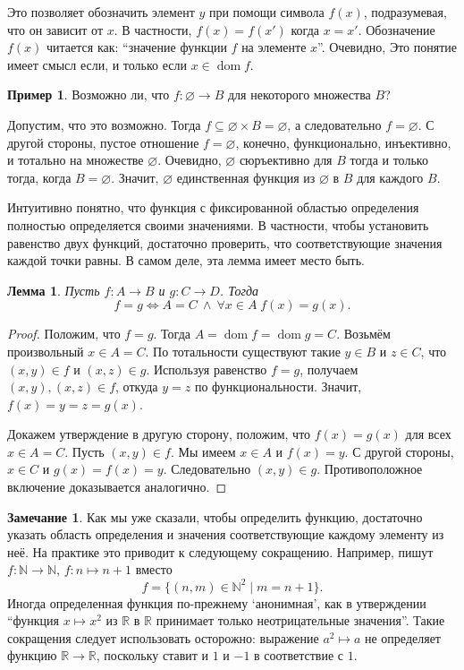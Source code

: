 \documentclass[12pt,notitlepage]{article}
\theoremstyle{plain}
\newtheorem{lemma}[thm]{Лемма}
\theoremstyle{definition}
\newtheorem{exm}[thm]{Пример}
\newtheorem{rem}[thm]{Замечание}
\theoremstyle{plain}
\newcommand{\N}{\mathbb{N}}
\newcommand{\R}{\mathbb{R}}
\newcommand{\sbs}{\subseteq}
\newcommand{\void}{\varnothing}
\newcommand{\dom}{\mathop{\mathrm{dom}}}
\newcommand{\1}{\mathbf{1}}
\newcommand{\0}{\mathbf{0}}
\begin{document}
Это позволяет обозначить элемент $y$ при помощи символа $f(x)$, подразумевая, что он зависит от $x$. В частности, $f(x) = f(x')$ когда $x = x'$. Обозначение $f(x)$ читается как: ``значение функции $f$ на элементе $x$''. Очевидно, Это понятие имеет смысл если, и только если $x \in \dom f$.


\begin{exm}\label{ch0:void_fnc}
	Возможно ли, что $f\colon \void \to B$ для некоторого множества $B$?
	
	Допустим, что это возможно. Тогда $f \sbs \void \times B = \void$, а следовательно $f = \void$. С другой стороны, пустое отношение $f = \void$, конечно, функционально, инъективно, и тотально на множестве $\void$. Очевидно, $\void$ сюръективно для $B$ тогда и только тогда, когда $B = \void$. Значит, $\void$ единственная функция из $\void$ в $B$ для каждого $B$.
\end{exm}
Интуитивно понятно, что функция с фиксированной областью определения полностью определяется своими значениями. В частности, чтобы установить равенство двух функций, достаточно проверить, что соответствующие значения каждой точки равны. В самом деле, эта лемма имеет место быть.
\begin{lemma}\label{ch0:tot_fnc_cmp}
	Пусть $f\colon A \to B$ и $g\colon C \to D$. Тогда
	$$f = g \iff A = C\ \wedge\ \forall x \in A\; f(x) = g(x).$$
\end{lemma}
\begin{proof}
	Положим, что $f = g$. Тогда $A = \dom f = \dom g = C$. Возьмём произвольный $x \in A = C$. По тотальности существуют такие $y \in B$ и $z \in C$, что $(x,y) \in f$ и $(x,z) \in g$. Используя равенство $f = g$, получаем $(x, y), (x, z) \in f$, откуда $y = z$ по функциональности. Значит, $f(x) = y = z = g(x)$.
	
	Докажем утверждение в другую сторону, положим, что $f(x) = g(x)$ для всех $x \in A = C$. Пусть $(x,y) \in f$. Мы имеем $x \in A$ и $f(x) = y$. С другой стороны, $x \in C$ и $g(x) = f(x) = y$. Следовательно $(x,y) \in g$. Противоположное включение доказывается аналогично.
\end{proof}

\begin{rem}
	Как мы уже сказали, чтобы определить функцию, достаточно указать область определения и значения соответствующие каждому элементу из неё. На практике это приводит к следующему сокращению. Например, пишут $f\colon \N \to \N$, $f\colon n \mapsto n + 1$ вместо
	$$f = \{(n,m) \in \N^2 \mid m = n + 1 \}.$$
	Иногда определенная функция по-прежнему `анонимная', как в утверждении ``функция $x \mapsto x^2$ из $\R$ в $\R$ принимает только неотрицательные значения''. Такие сокращения следует использовать осторожно: выражение $a^2 \mapsto a$ не определяет функцию $\R \to \R$, поскольку ставит и $1$ и $-1$ в соответствие с $1$. 
\end{rem}
\end{document}
